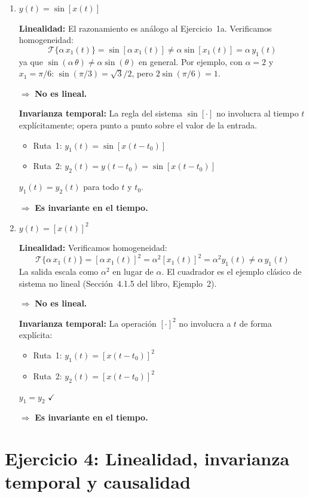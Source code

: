 \documentclass[10pt,a4paper]{article}
\begin{document}
	\begin{enumerate}[label=\textbf{\alph*)}]
		\item $y(t) = \sin[x(t)]$
		
		\textbf{Linealidad:} El razonamiento es análogo al Ejercicio~1a. Verificamos homogeneidad:
		\[
		\mathcal{T}\{\alpha\,x_1(t)\} = \sin[\alpha\,x_1(t)] \neq \alpha\sin[x_1(t)] = \alpha\,y_1(t)
		\]
		ya que $\sin(\alpha\,\theta) \neq \alpha\sin(\theta)$ en general. Por ejemplo, con $\alpha = 2$ y $x_1 = \pi/6$: $\sin(\pi/3) = \sqrt{3}/2$, pero $2\sin(\pi/6) = 1$.
		
		$\Rightarrow$ \textbf{No es lineal.}
		
		\textbf{Invarianza temporal:} La regla del sistema $\sin[\cdot]$ no involucra al tiempo $t$ explícitamente; opera punto a punto sobre el valor de la entrada.
		\begin{itemize}
			\item Ruta~1: $y_1(t) = \sin[x(t-t_0)]$
			\item Ruta~2: $y_2(t) = y(t-t_0) = \sin[x(t-t_0)]$
		\end{itemize}
		$y_1(t) = y_2(t)$ para todo $t$ y $t_0$.
		
		$\Rightarrow$ \textbf{Es invariante en el tiempo.}
		
		\item $y(t) = [x(t)]^2$
		
		\textbf{Linealidad:} Verificamos homogeneidad:
		\[
		\mathcal{T}\{\alpha\,x_1(t)\} = [\alpha\,x_1(t)]^2 = \alpha^2[x_1(t)]^2 = \alpha^2 y_1(t) \neq \alpha\,y_1(t)
		\]
		La salida escala como $\alpha^2$ en lugar de $\alpha$. El cuadrador es el ejemplo clásico de sistema no lineal (Sección~4.1.5 del libro, Ejemplo~2).
		
		$\Rightarrow$ \textbf{No es lineal.}
		
		\textbf{Invarianza temporal:} La operación $[\cdot]^2$ no involucra a $t$ de forma explícita:
		\begin{itemize}
			\item Ruta~1: $y_1(t) = [x(t-t_0)]^2$
			\item Ruta~2: $y_2(t) = [x(t-t_0)]^2$
		\end{itemize}
		$y_1 = y_2$ $\checkmark$
		
		$\Rightarrow$ \textbf{Es invariante en el tiempo.}
	\end{enumerate}

	\section*{Ejercicio 4: Linealidad, invarianza temporal y causalidad}
	
\end{document}
